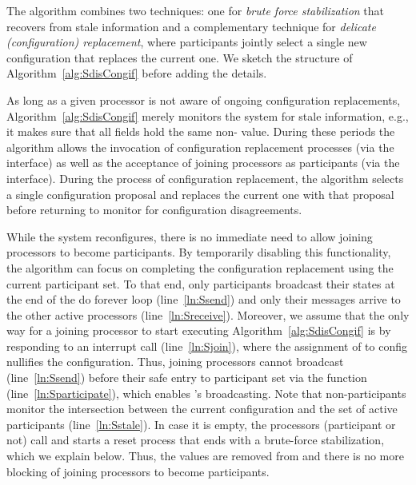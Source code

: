 \documentclass[11pt]{article}
\begin{document}
{\begin{algorithm}[t!]
\end{algorithm}
\setlength{\textfloatsep}{5pt}

The algorithm combines two techniques: one for \emph{brute force stabilization} that recovers from stale information and a complementary technique for \emph{delicate (configuration) replacement}, where participants jointly select a single new configuration that replaces the current one. We sketch the structure of Algorithm~\ref{alg:SdisCongif} before adding the details.  



As long as a given processor is not aware of ongoing configuration replacements, Algorithm~\ref{alg:SdisCongif} merely monitors the system for stale information, e.g., it makes sure that all  fields hold the same non- value. During these periods the algorithm allows the invocation of configuration replacement processes (via the  interface) as well as the acceptance of joining processors as participants (via the  interface). During the process of configuration replacement, the algorithm selects a single configuration proposal and replaces the current one with that proposal before returning to monitor for configuration disagreements.



While the system reconfigures, there is no immediate need to allow joining processors to become participants. By temporarily disabling this functionality, the algorithm can focus on completing the configuration replacement using the current participant set. To that end, 
only participants broadcast their states at the end of the do forever loop (line~\ref{ln:Ssend}) and only their messages arrive to the other active processors (line~\ref{ln:Sreceive}). Moreover, we assume that the only way for a joining processor to start executing Algorithm~\ref{alg:SdisCongif} is by responding to an interrupt call (line~\ref{ln:Sjoin}), where  the assignment of  to \textnormal{config} nullifies the configuration. Thus, joining processors cannot broadcast (line~\ref{ln:Ssend}) before their safe entry to participant set via the function  (line~\ref{ln:Sparticipate}), which enables 's broadcasting. 
Note that non-participants monitor the intersection between the current configuration and the set of active participants (line~\ref{ln:Sstale}). In case it is empty, the processors (participant or not) call  and starts a reset process that ends with a brute-force stabilization, which we explain below. Thus, the  values are removed from  and there is no more blocking of joining processors to become participants.








}
\end{document}
